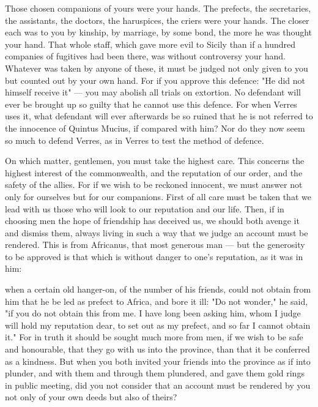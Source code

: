  Those chosen companions of yours were your hands. The prefects, the secretaries, the assistants, the doctors, the haruspices, the criers were your hands. The closer each was to you by kinship, by marriage, by some bond, the more he was thought your hand. That whole staff, which gave more evil to Sicily than if a hundred companies of fugitives had been there, was without controversy your hand. Whatever was taken by anyone of these, it must be judged not only given to you but counted out by your own hand. For if you approve this defence: "He did not himself receive it" --- you may abolish all trials on extortion. No defendant will ever be brought up so guilty that he cannot use this defence. For when Verres uses it, what defendant will ever afterwards be so ruined that he is not referred to the innocence of Quintus Mucius, if compared with him? Nor do they now seem so much to defend Verres, as in Verres to test the method of defence.

 On which matter, gentlemen, you must take the highest care. This concerns the highest interest of the commonwealth, and the reputation of our order, and the safety of the allies. For if we wish to be reckoned innocent, we must answer not only for ourselves but for our companions. First of all care must be taken that we lead with us those who will look to our reputation and our life. Then, if in choosing men the hope of friendship has deceived us, we should both avenge it and dismiss them, always living in such a way that we judge an account must be rendered. This is from Africanus, that most generous man --- but the generosity to be approved is that which is without danger to one's reputation, as it was in him:

 when a certain old hanger-on, of the number of his friends, could not obtain from him that he be led as prefect to Africa, and bore it ill: "Do not wonder," he said, "if you do not obtain this from me. I have long been asking him, whom I judge will hold my reputation dear, to set out as my prefect, and so far I cannot obtain it." For in truth it should be sought much more from men, if we wish to be safe and honourable, that they go with us into the province, than that it be conferred as a kindness. But when you both invited your friends into the province as if into plunder, and with them and through them plundered, and gave them gold rings in public meeting, did you not consider that an account must be rendered by you not only of your own deeds but also of theirs?

